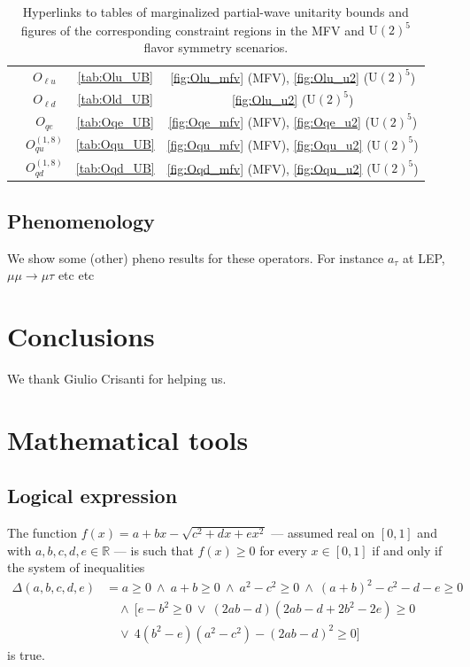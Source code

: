 \documentclass[a4paper,11pt]{article}
\newcommand{\as}[1]{{\color{red} #1}}
\begin{document}
\begin{table}[h!tb]
\begin{tabular}{cccc}
    & $O_{\ell u}$ &\ref{tab:Olu_UB}& \ref{fig:Olu_mfv} (MFV), \ref{fig:Olu_u2} ($\mathrm{U}(2)^5$) \\
    & $O_{\ell d}$ &\ref{tab:Old_UB}&  \ref{fig:Olu_u2} ($\mathrm{U}(2)^5$) \\
    & $O_{qe}$ &\ref{tab:Oqe_UB}& \ref{fig:Oqe_mfv} (MFV), \ref{fig:Oqe_u2} ($\mathrm{U}(2)^5$) \\
    & $O_{qu}^{(1,8)}$ &\ref{tab:Oqu_UB}& \ref{fig:Oqu_mfv} (MFV), \ref{fig:Oqu_u2} ($\mathrm{U}(2)^5$) \\
    & $O_{qd}^{(1,8)}$ &\ref{tab:Oqd_UB}& \ref{fig:Oqd_mfv} (MFV), \ref{fig:Oqu_u2} ($\mathrm{U}(2)^5$) \\
    \bottomrule
    \end{tabular}
    \caption{Hyperlinks to tables of marginalized partial-wave unitarity bounds and figures of the corresponding constraint regions in the MFV and $\mathrm{U}(2)^5$ flavor symmetry scenarios.}
    \label{tab:summary}
\end{table}

\clearpage




\subsection{Phenomenology}
\as{We show some (other) pheno results for these operators. For instance $a_\tau$ at LEP, $\mu\mu\to\mu\tau$ etc etc}

\clearpage
\section{Conclusions}

\acknowledgments
We thank Giulio Crisanti for helping us.

\clearpage
\appendix

\section{Mathematical tools}

\subsection{Logical expression}\label{sec:appendix, logical expression}

The function $f(x) = a + bx - \sqrt{c^2 + dx + ex^2}$ --- assumed real on $[0,1]$ and with $a,b,c,d,e\in\mathbb{R}$ --- is such that $f(x) \ge 0$ for every $x \in [0,1]$ if and only if the system of inequalities
\begin{align}
    \Delta(a,b,c,d,e) &= 
    a \ge 0 
    \ \land \
    a+b \ge 0
    \ \land \ 
    a^2 - c^2 \ge 0
    \ \land \ 
    (a+b)^2 - c^2 -d-e \ge 0 \nonumber
    \\& \quad
    \land \
    [e - b^2 \ge 0 \ \lor\  (2ab-d)(2ab-d+2b^2-2e) \ge 0 \nonumber 
    \\& \quad
    \lor \ 4(b^2-e)(a^2-c^2)-(2ab-d)^2 \ge 0]
\end{align}
is true.
\end{document}
